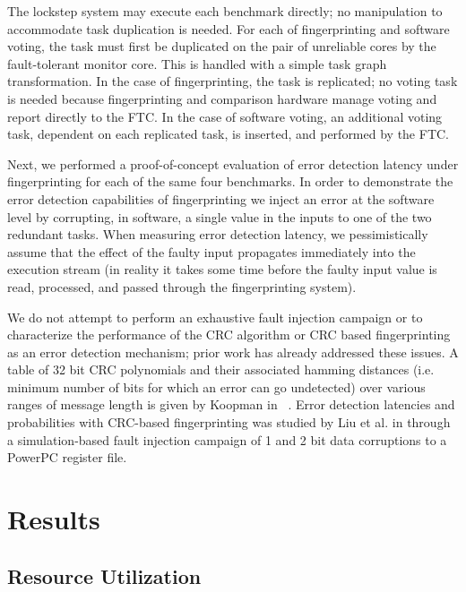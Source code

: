 	The lockstep system may execute each benchmark directly;
		no manipulation to accommodate task duplication is needed.
	For each of fingerprinting and software voting, the task must first be duplicated on the pair of unreliable cores by the fault-tolerant monitor core.
	This is handled with a simple task graph transformation.
	In the case of fingerprinting, the task is replicated;
		no voting task is needed because fingerprinting and comparison hardware manage voting and report directly to the FTC.
	In the case of software voting, an additional voting task, dependent on each replicated task, is inserted, and performed by the FTC.

	Next, we performed a proof-of-concept evaluation of error detection latency under fingerprinting for each of the same four benchmarks.
	In order to demonstrate the error detection capabilities of fingerprinting we inject an error at the software level by corrupting, in software, a single value in the inputs to one of the two redundant tasks.
	When measuring error detection latency, we pessimistically assume that the effect of the faulty input propagates immediately into the execution stream (in reality it takes some time before the faulty input value is read, processed, and passed through the fingerprinting system).

	We do not attempt to perform an exhaustive fault injection campaign or to characterize the performance of the CRC algorithm or CRC based fingerprinting as an error detection mechanism; prior work has already addressed these issues.
	A table of 32 bit CRC polynomials and their associated hamming distances (i.e. minimum number of bits for which an error can go undetected) over various ranges of message length is given by Koopman in ~\cite{koopman200232}.
	Error detection latencies and probabilities with CRC-based fingerprinting was studied by Liu et al. in \cite{Meyer:13} through a simulation-based fault injection campaign of 1 and 2 bit data corruptions to a PowerPC register file.
	
	
\section{Results}
\label{s:results}

\subsection{Resource Utilization}

